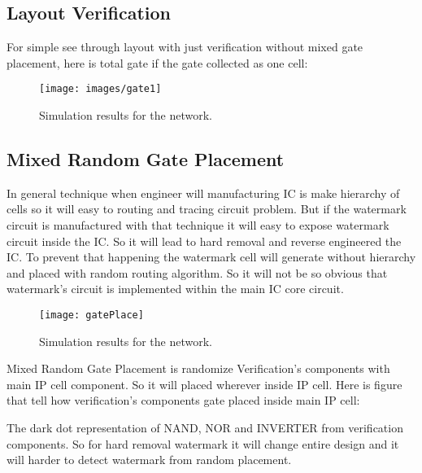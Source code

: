 \documentclass[10pt,journal,compsoc]{IEEEtran}
\begin{document}
\subsection{Layout Verification}
For simple see through layout with just verification without mixed gate placement, here is total gate if the gate collected as one cell:
\begin{figure}[h]
	\centering
	\texttt{[image: images/gate1]}
	\caption{Simulation results for the network.}
	\label{fig_sim}
\end{figure}


\subsection{Mixed Random Gate Placement}
In general technique when engineer will manufacturing IC is make hierarchy of cells so it will easy to routing and tracing circuit problem. But if the watermark circuit is manufactured with that technique it will easy to expose watermark circuit inside the IC. So it will lead to hard removal and reverse engineered the IC. To prevent that happening the watermark cell will generate without hierarchy and placed with random routing algorithm. So it will not be so obvious that watermark’s circuit is implemented within the main IC core circuit.

\begin{figure}[h]
	\centering
	\texttt{[image: gatePlace]}
	\caption{Simulation results for the network.}
	\label{fig_sim}
\end{figure}

Mixed Random Gate Placement is randomize Verification’s components with main IP cell component. So it will placed wherever inside IP cell. Here is figure that tell how verification’s components gate placed inside main IP cell:

The dark dot representation of NAND, NOR and INVERTER from verification components. So for hard removal watermark it will change entire design and it will harder to detect watermark from random placement.

\end{document}
